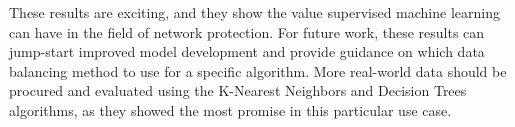 \documentclass[conference]{IEEEtran}
\begin{document}
These results are exciting, and they show the value supervised machine learning can have in the field of network protection. For future work, these results can jump-start improved model development and provide guidance on which data balancing method to use for a specific algorithm. More real-world data should be procured and evaluated using the K-Nearest Neighbors and Decision Trees algorithms, as they showed the most promise in this particular use case.



\end{document}
